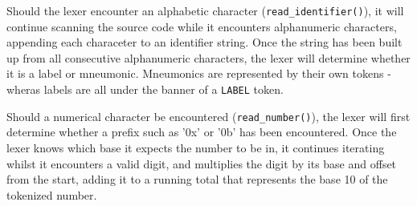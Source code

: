 Should the lexer encounter an alphabetic character (\texttt{read\_identifier()}), it will continue scanning the source code while it encounters alphanumeric characters, appending each characeter to an identifier string. Once the string has been built up from all consecutive alphanumeric characters, the lexer will determine whether it is a label or mneumonic. Mneumonics are represented by their own tokens - wheras labels are all under the banner of a \texttt{LABEL} token.

Should a numerical character be encountered (\texttt{read\_number()}), the lexer will first determine whether a prefix such as '0x' or '0b' has been encountered. Once the lexer knows which base it expects the number to be in, it continues iterating whilst it encounters a valid digit, and multiplies the digit by its base and offset from the start, adding it to a running total that represents the base 10 of the tokenized number. 

